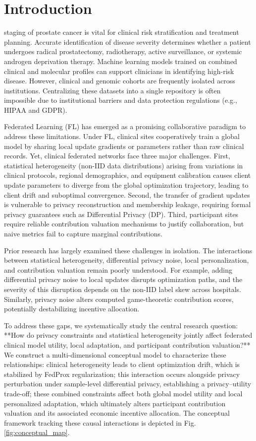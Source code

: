 \documentclass[conference]{IEEEtran}
\begin{document}
\section{Introduction}
 staging of prostate cancer is vital for clinical risk stratification and treatment planning. Accurate identification of disease severity determines whether a patient undergoes radical prostatectomy, radiotherapy, active surveillance, or systemic androgen deprivation therapy. Machine learning models trained on combined clinical and molecular profiles can support clinicians in identifying high-risk disease. However, clinical and genomic cohorts are frequently isolated across institutions. Centralizing these datasets into a single repository is often impossible due to institutional barriers and data protection regulations (e.g., HIPAA and GDPR).

Federated Learning (FL) has emerged as a promising collaborative paradigm to address these limitations. Under FL, clinical sites cooperatively train a global model by sharing local update gradients or parameters rather than raw clinical records. Yet, clinical federated networks face three major challenges. First, statistical heterogeneity (non-IID data distributions) arising from variations in clinical protocols, regional demographics, and equipment calibration causes client update parameters to diverge from the global optimization trajectory, leading to client drift and suboptimal convergence. Second, the transfer of gradient updates is vulnerable to privacy reconstruction and membership leakage, requiring formal privacy guarantees such as Differential Privacy (DP). Third, participant sites require reliable contribution valuation mechanisms to justify collaboration, but naive metrics fail to capture marginal contributions.

Prior research has largely examined these challenges in isolation. The interactions between statistical heterogeneity, differential privacy noise, local personalization, and contribution valuation remain poorly understood. For example, adding differential privacy noise to local updates disrupts optimization paths, and the severity of this disruption depends on the non-IID label skew across hospitals. Similarly, privacy noise alters computed game-theoretic contribution scores, potentially destabilizing incentive allocation.

To address these gaps, we systematically study the central research question: **How do privacy constraints and statistical heterogeneity jointly affect federated clinical model utility, local adaptation, and participant contribution valuation?** We construct a multi-dimensional conceptual model to characterize these relationships: clinical heterogeneity leads to client optimization drift, which is stabilized by FedProx regularization; this interaction occurs alongside privacy perturbation under sample-level differential privacy, establishing a privacy--utility trade-off; these combined constraints affect both global model utility and local personalized adaptation, which ultimately alters participant contribution valuation and its associated economic incentive allocation. The conceptual framework tracking these causal interactions is depicted in Fig. \ref{fig:conceptual_map}.
\end{document}
